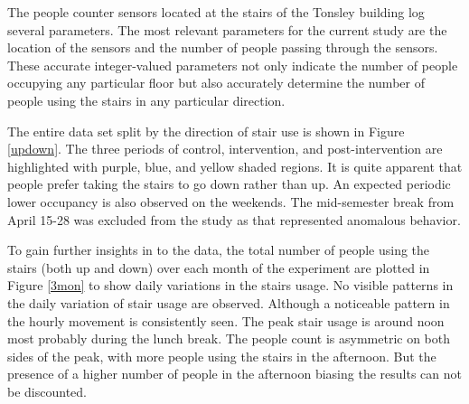 The people counter sensors located at the stairs of the Tonsley building log several parameters. The most relevant parameters for the current study are the location of the sensors and the number of people passing through the sensors. These accurate integer-valued parameters not only indicate the number of people occupying any particular floor but also accurately determine the number of people using the stairs in any particular direction.

The entire data set split by the direction of stair use is shown in Figure \ref{updown}. The three periods of control, intervention, and post-intervention are highlighted with purple, blue, and yellow shaded regions. It is quite apparent that people prefer taking the stairs to go down rather than up. An expected periodic lower occupancy is also observed on the weekends. The mid-semester break from April 15-28 was excluded from the study as that represented anomalous behavior.

To gain further insights in to the data, the total number of people using the stairs (both up and down) over each month of the experiment are plotted in Figure \ref{3mon} to show daily variations in the stairs usage. No visible patterns in the daily variation of stair usage are observed.  Although a noticeable pattern in the hourly movement is consistently seen. The peak stair usage is around noon most probably during the lunch break. The people count is asymmetric on both sides of the peak, with more people using the stairs in the afternoon. But the presence of a higher number of people in the afternoon biasing the results can not be discounted. %





